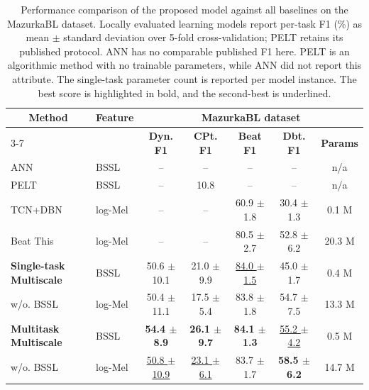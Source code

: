 \begin{table}[!htbp]
\centering
\caption{Performance comparison of the proposed model against all baselines on the MazurkaBL dataset. Locally evaluated learning models report per-task F1 (\%) as mean $\pm$ standard deviation over 5-fold cross-validation; PELT retains its published protocol. ANN has no comparable published F1 here. PELT is an algorithmic method with no trainable parameters, while ANN did not report this attribute. The single-task parameter count is reported per model instance. The best score is highlighted in bold, and the second-best is underlined.}
\label{tab:audiodyn_main_results}
\fontsize{10pt}{12pt}\selectfont
\setlength{\tabcolsep}{6pt}
\renewcommand{\arraystretch}{1.3}
\begin{tabular}{l|l|ccccc}
\toprule
\multicolumn{1}{c|}{\multirow{2}{*}{\textbf{Method}}}
& \multicolumn{1}{c|}{\multirow{2}{*}{\textbf{Feature}}}
& \multicolumn{5}{c}{\textbf{MazurkaBL dataset}} \\
\cmidrule(l){3-7}
& & \textbf{Dyn. F1} & \textbf{CPt. F1} & \textbf{Beat F1} & \textbf{Dbt. F1} & \textbf{Params} \\
\midrule
ANN \cite{kosta2017thesis} & BSSL & -- & -- & -- & -- & n/a \\
PELT \cite{kosta2017thesis} & BSSL & -- & 10.8 & -- & -- & n/a \\
TCN+DBN \cite{bock2020deconstruct} & log-Mel & -- & -- & 60.9 $\pm$ 1.8 & 30.4 $\pm$ 1.3 & 0.1 M \\
Beat This \cite{foscarin2024beat} & log-Mel & -- & -- & 80.5 $\pm$ 2.7 & 52.8 $\pm$ 6.2 & 20.3 M \\
\midrule
\textbf{Single-task Multiscale} \quad & BSSL & 50.6 $\pm$ 10.1 & 21.0 $\pm$ 9.9 & \underline{84.0 $\pm$ 1.5} & 45.0 $\pm$ 1.7 & 0.4 M \\
\quad w/o. BSSL & log-Mel & 50.4 $\pm$ 11.1 & 17.5 $\pm$ 5.4 & 83.8 $\pm$ 1.8 & 54.7 $\pm$ 7.5 & 13.3 M \\
\midrule
\textbf{Multitask Multiscale} & BSSL & \textbf{54.4 $\pm$ 8.9} & \textbf{26.1 $\pm$ 9.7} & \textbf{84.1 $\pm$ 1.3} & \underline{55.2 $\pm$ 4.2} & 0.5 M \\
\quad w/o. BSSL & log-Mel & \underline{50.8 $\pm$ 10.9} & \underline{23.1 $\pm$ 6.1} & 83.7 $\pm$ 1.7 & \textbf{58.5 $\pm$ 6.2} & 14.7 M \\
\bottomrule
\end{tabular}
\end{table}

